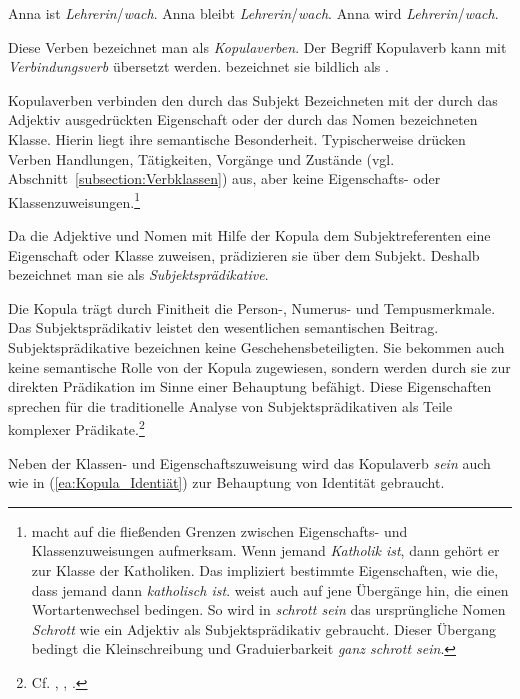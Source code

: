 \ea \label{ea:SP}
\ea \label{ea:seinSP} Anna ist \textit{Lehrerin}/\textit{wach}.
\ex \label{ex:bleibenSP} Anna bleibt \textit{Lehrerin}/\textit{wach}.
\ex \label{ex:werdenSP} Anna wird \textit{Lehrerin}/\textit{wach}.
\z 
\z 

Diese Verben bezeichnet man als \textit{Kopulaverben}. Der Begriff Kopulaverb kann mit \textit{Verbindungsverb} übersetzt werden. \citet[72]{Musan2021_SGA} bezeichnet sie bildlich als . 

Kopulaverben verbinden den durch das Subjekt Bezeichneten mit der durch das Adjektiv ausgedrückten Eigenschaft oder der durch das Nomen bezeichneten Klasse. Hierin liegt ihre semantische Besonderheit. Typischerweise drücken Verben Handlungen, Tätigkeiten, Vorgänge und Zustände (vgl. Abschnitt~\ref{subsection:Verbklassen}) aus, aber keine Eigenschafts- oder Klassenzuweisungen.\footnote{\citet[183]{Welke2019} macht auf die fließenden Grenzen zwischen Eigenschafts- und Klassenzuweisungen  aufmerksam. Wenn jemand \textit{Katholik ist}, dann gehört er zur Klasse der Katholiken. Das impliziert bestimmte Eigenschaften, wie die, dass jemand dann \textit{katholisch ist}. \citet[362]{Agel2017} weist auch auf jene Übergänge hin, die einen Wortartenwechsel bedingen. So wird in \textit{schrott sein} das ursprüngliche Nomen \textit{Schrott} wie ein Adjektiv als Subjektsprädikativ gebraucht. Dieser Übergang bedingt die Kleinschreibung und Graduierbarkeit \textit{ganz schrott sein}.} 

Da die Adjektive und Nomen mit Hilfe der Kopula dem Subjektreferenten eine Eigenschaft oder Klasse zuweisen, prädizieren sie über dem Subjekt. Deshalb bezeichnet man sie als \textit{Subjektsprädikative}. 

Die Kopula trägt durch Finitheit die Person-, Numerus- und Tempusmerkmale. Das Subjektsprädikativ leistet den wesentlichen semantischen Beitrag. Subjektsprädikative bezeichnen keine Geschehensbeteiligten. Sie bekommen auch keine semantische Rolle von der Kopula zugewiesen, sondern werden durch sie zur direkten Prädikation im Sinne einer Behauptung befähigt. Diese Eigenschaften sprechen für die traditionelle Analyse von Subjektsprädikativen als Teile komplexer Prädikate.\footnote{Cf. \citet[249]{HeidolphFlaemigMotsch1981}, \citet[1107]{ZifHoffStr1997}, \citet[374--380]{Agel2017}.} 

Neben der Klassen- und Eigenschaftszuweisung wird das Kopulaverb \textit{sein} auch wie in (\ref{ea:Kopula_Identiät}) zur Behauptung von Identität gebraucht.

